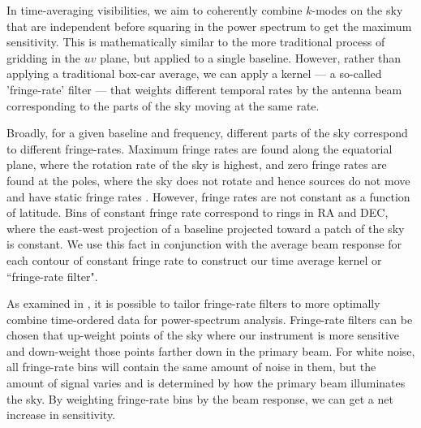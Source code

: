 \documentclass[twocolumn,numberedappendix]{emulateapj} \shorttitle{PSA64}
\begin{document}
In time-averaging visibilities,
we aim
to coherently combine  $k$-modes on the sky that are independent  before squaring in the power spectrum to get the maximum
sensitivity. This is mathematically similar to the more traditional process of
gridding in the $uv$ plane, but applied to a single baseline.  
However, rather
than applying a traditional box-car average, we can apply a kernel --- a so-called
'fringe-rate' filter --- that weights different temporal rates by the antenna
beam corresponding to the parts of the sky moving at the same rate.

Broadly, for a given baseline and frequency, different parts of the sky
correspond to different fringe-rates.  Maximum fringe rates are found along the
equatorial plane, where the rotation rate of the sky is highest, and zero
fringe rates are found at the poles, where the sky does not rotate and hence
sources do not move and have static fringe rates \citep{parsons_backer2009}.
However, fringe rates are not constant as a function of latitude. Bins of
constant fringe rate correspond to rings in RA and DEC, where
the east-west projection of a baseline projected toward a patch of the sky is
constant.  We use this fact in conjunction with the average beam response for each
contour of constant fringe rate to construct our time average kernel or
``fringe-rate filter".


%

As examined in \citet{parsons_et_al2015}, it is possible to tailor fringe-rate filters
to more optimally combine time-ordered data for power-spectrum analysis.
Fringe-rate filters can be chosen that
up-weight points of the sky where our instrument is more sensitive and down-weight
those points farther down in the primary beam. 
For white noise,
all fringe-rate bins will contain the same amount of noise in them, but the amount of signal
varies and is determined by how the primary beam illuminates the sky.
By weighting fringe-rate
bins by the beam response, we can get a net increase in sensitivity.  
\end{document}
